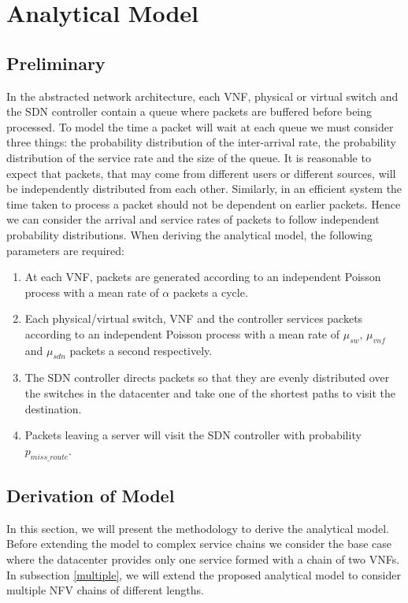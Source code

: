 
\section{Analytical Model}
\label{sec:analytical_model}
\subsection{Preliminary}
In the abstracted network architecture, each VNF, physical or virtual switch and the SDN controller contain a queue where packets are buffered before being processed. To model the time a packet will wait at each queue we must consider three things: the probability distribution of the inter-arrival rate, the probability distribution of the service rate and the size of the queue. It is reasonable to expect that packets, that may come from different users or different sources, will be independently distributed from each other. Similarly, in an efficient system the time taken to process a packet should not be dependent on earlier packets. Hence we can consider the arrival and service rates of packets to follow independent probability distributions. When deriving the analytical model, the following parameters are required:
\begin{enumerate}
\item At each VNF, packets are generated according to an independent Poisson process with a mean rate of $\alpha$ packets a cycle. 
\item Each physical/virtual switch, VNF and the controller services packets according to an independent Poisson process with a mean rate of $\mu_{sw}$, $\mu_{vnf}$ and $\mu_{sdn}$ packets a second respectively.
\item The SDN controller directs packets so that they are evenly distributed over the switches in the datacenter and take one of the shortest paths to visit the destination.
\item Packets leaving a server will visit the SDN controller with probability $p_{miss\_route}$.
\end{enumerate}

\subsection{Derivation of Model}
In this section, we will present the methodology to derive the analytical model. Before extending the model to complex service chains we consider the base case where the datacenter provides only one service formed with a chain of two VNFs. In subsection \ref{multiple}, we will extend the proposed analytical model to consider multiple NFV chains of different lengths.

